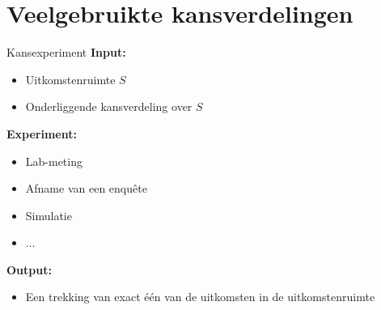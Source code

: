 \section{Veelgebruikte kansverdelingen}

    \begin{frame}{Kansexperiment}
        \textbf{Input:} \medskip

        \begin{itemize}
            \item Uitkomstenruimte $S$
            \item { Onderliggende kansverdeling over $S$ }
        \end{itemize}\medskip

        \textbf{Experiment:} \medskip

        \begin{itemize}
            \item Lab-meting
            \item Afname van een enquête
            \item Simulatie
            \item $\ldots$
        \end{itemize}\medskip

        \textbf{Output:} \medskip

        \begin{itemize}
            \item Een trekking van exact één van de uitkomsten in de uitkomstenruimte
        \end{itemize}
    \end{frame}

